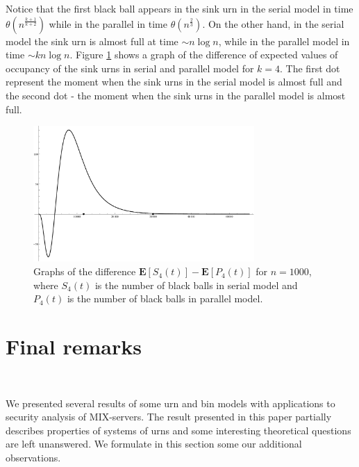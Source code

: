 \documentclass[submission]{dmtcs}
\newcommand{\E}[1]{\mathbf{E}\left[#1\right]}
\newcommand{\Marek} [1]{\marginpar{\scriptsize {\bf MKlo}:#1}}
\begin{document}
Notice that the first black ball appears in the sink urn in the serial model in time
$\theta(n^{\frac{k+1}{k+2}})$ while in the parallel in time 
$\theta(n^{\frac{2}{3}})$. 
On the other hand, in the serial model the sink urn is almost full at time
$\sim n\log n$, while in the parallel model in time $\sim k n\log n$.
Figure \ref{fig:difference} shows a graph of the difference of expected values 
of occupancy of the sink urns in serial and parallel model for $k=4$.
The first dot represent the moment when the sink urns in the serial model is almost full 
and  the second dot - the moment when the sink urns in the parallel model is almost full.

\begin{figure}[!t]
  \begin{center}
     \includegraphics[width=0.75\textwidth]{Difference.pdf}
  \end{center}
  \caption{
	Graphs of the difference $\E{S_{4}(t)} - \E{P_{4}(t)}$ 
	for $n=1000$, where $S_4(t)$ is the number of black balls 
	in serial model and $P_4(t)$ is the number of black balls 
	in parallel model.
	}
  \label{fig:difference}
\end{figure}


\section{Final remarks}~\label{Con}
\label{sec:FinalRemarks}

We presented several results of some urn and bin models with applications to security analysis of MIX-servers. 
The result presented in this paper partially describes properties of systems of urns  and some interesting theoretical questions are left unanswered.  We formulate in this section some our additional observations. 
\end{document}
